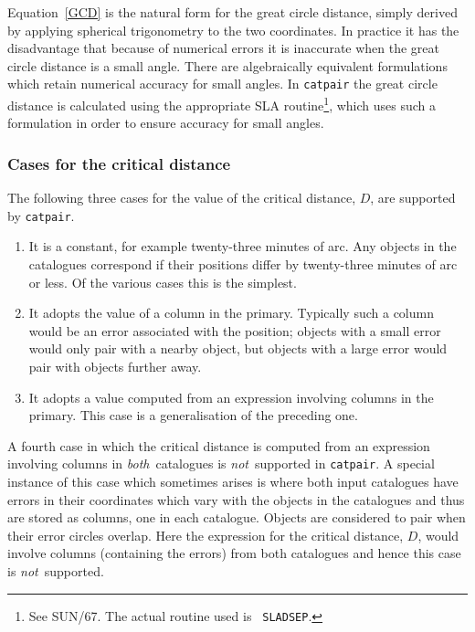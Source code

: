 \documentclass[twoside,11pt]{article}
\newcommand{\xref}[3]{#1}
\renewcommand{\_}{\texttt{\symbol{95}}}
\begin{document}
Equation~\ref{GCD} is the natural form for the great circle distance,
simply derived by applying spherical trigonometry to the two
coordinates. In practice it has the disadvantage that because of
numerical errors it is inaccurate when the great circle distance is a
small angle. There are algebraically equivalent formulations which
retain numerical accuracy for small angles. In {\tt catpair} the great 
circle distance is calculated using the appropriate SLA routine\footnote{See
\xref{SUN/67}{sun67}{}\cite{SUN67}. The actual routine used is {\tt
SLA\_DSEP}.}, which uses such a formulation in order to ensure accuracy for
small angles.

\subsubsection{\label{CRIT_DIST}Cases for the critical distance}

The following three cases for the value of the critical distance,
$D$, are supported by {\tt catpair}.

\begin{enumerate}

  \item It is a constant, for example twenty-three minutes of arc.  Any
   objects in the catalogues correspond if their positions differ by
   twenty-three minutes of arc or less.  Of the various cases this is
   the simplest.

  \item It adopts the value of a column in the primary. Typically such a 
   column would be an error associated with the position; objects with a 
   small error would only pair with a nearby object, but objects with a 
   large error would pair with objects further away.

  \item It adopts a value computed from an expression involving columns
   in the primary. This case is a generalisation of the preceding one.

\end{enumerate}

A fourth case in which the critical distance is computed from an
expression involving columns in {\it both}\, catalogues is {\it not}\,
supported in {\tt catpair}. A special instance of this case which sometimes 
arises is where both input catalogues have errors in their coordinates which 
vary with the objects in the catalogues and thus are stored as columns, one 
in each catalogue. Objects are considered to pair when their error circles 
overlap. Here the expression for the critical distance, $D$, would involve 
columns (containing the errors) from both catalogues and hence this case is
{\it not}\, supported.
\end{document}
